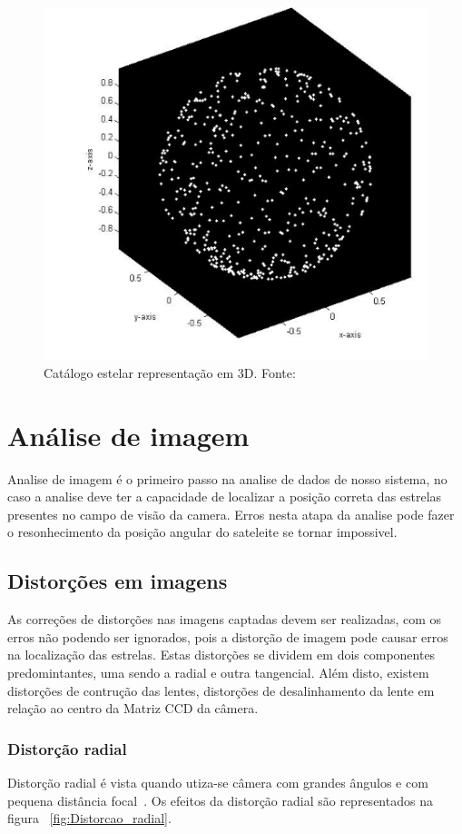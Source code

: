 \begin{figure}[h]
	\centering
	\includegraphics[width=.7\columnwidth]{images/Representacao_3D.png}
	\caption{Catálogo estelar representação em 3D. Fonte: ~\cite[]{Diaz}}
	\label{fig:Representacao_3D}
\end{figure}

\section{Análise de imagem}

Analise de imagem é o primeiro passo na analise de dados de nosso sistema, no caso a analise deve ter a capacidade de localizar a posição correta das estrelas presentes no campo de visão da camera.
Erros nesta atapa da analise pode fazer o resonhecimento da posição angular do sateleite se tornar impossivel.

\subsection{Distorções em imagens}
As correções de distorções nas imagens captadas devem ser realizadas, com os erros não podendo ser ignorados, pois a distorção de imagem pode causar erros na localização das estrelas. Estas distorções se dividem em dois componentes predomintantes, uma sendo a radial e outra tangencial.
Além disto, existem distorções de contrução das lentes, distorções de desalinhamento da lente em relação ao centro da Matriz CCD da câmera.

\subsubsection{Distorção radial}
Distorção radial é vista quando utiza-se câmera com grandes ângulos e com pequena distância focal~\cite[]{Mallon}.
Os efeitos da distorção radial são representados na figura ~\ref{fig:Distorcao_radial}.

